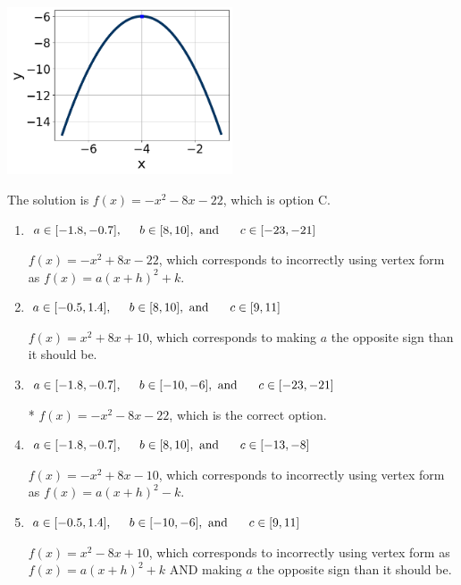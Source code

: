 \documentclass{extbook}[14pt]
\begin{document}
\begin{enumerate}
{\begin{center}
    \includegraphics[width=0.5\textwidth]{../Figures/quadraticGraphToEquationC.png}
\end{center}



The solution is \( f(x) = -x^{2} -8 x -22 \), which is option C.\begin{enumerate}[label=\Alph*.]
\item \( a \in [-1.8, -0.7], \hspace*{5mm} b \in [8, 10], \text{ and } \hspace*{5mm} c \in [-23, -21] \)

$f(x)=-x^{2} +8 x -22$, which corresponds to incorrectly using vertex form as $f(x) = a(x+h)^2+k$.
\item \( a \in [-0.5, 1.4], \hspace*{5mm} b \in [8, 10], \text{ and } \hspace*{5mm} c \in [9, 11] \)

$f(x)=x^{2} +8 x + 10$, which corresponds to making $a$ the opposite sign than it should be.
\item \( a \in [-1.8, -0.7], \hspace*{5mm} b \in [-10, -6], \text{ and } \hspace*{5mm} c \in [-23, -21] \)

* $f(x)=-x^{2} -8 x -22$, which is the correct option.
\item \( a \in [-1.8, -0.7], \hspace*{5mm} b \in [8, 10], \text{ and } \hspace*{5mm} c \in [-13, -8] \)

$f(x)=-x^{2} +8 x -10$, which corresponds to incorrectly using vertex form as $f(x) = a(x+h)^2 - k$.
\item \( a \in [-0.5, 1.4], \hspace*{5mm} b \in [-10, -6], \text{ and } \hspace*{5mm} c \in [9, 11] \)

$f(x)=x^{2} -8 x + 10$, which corresponds to incorrectly using vertex form as $f(x) = a(x+h)^2+k$ AND making $a$ the opposite sign than it should be.
\end{enumerate}

}
\end{enumerate}
\end{document}
